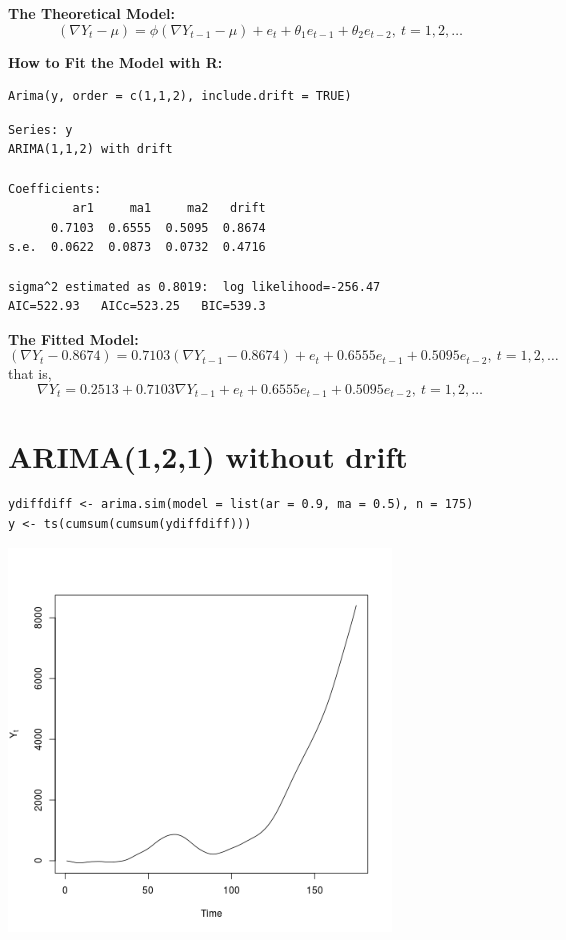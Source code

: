 \documentclass[12pt]{article}
\begin{document}
\noindent
\textbf{The Theoretical Model:} 
\[
(\nabla Y_{t} - \mu) = \phi(\nabla Y_{t - 1} - \mu) +  e_{t} + \theta_{1} e_{t - 1} + \theta_{2} e_{t - 2},\ t = 1,2,\ldots
\]

\noindent
\textbf{How to Fit the Model with R:}


\begin{verbatim}
Arima(y, order = c(1,1,2), include.drift = TRUE)
\end{verbatim}




\begin{verbatim}
Series: y 
ARIMA(1,1,2) with drift         

Coefficients:
         ar1     ma1     ma2   drift
      0.7103  0.6555  0.5095  0.8674
s.e.  0.0622  0.0873  0.0732  0.4716

sigma^2 estimated as 0.8019:  log likelihood=-256.47
AIC=522.93   AICc=523.25   BIC=539.3
\end{verbatim}

\noindent
\textbf{The Fitted Model:} 
\[
(\nabla Y_{t} - 0.8674 ) = 0.7103 (\nabla Y_{t - 1} - 0.8674 ) + e_{t} + 0.6555 e_{t - 1} + 0.5095 e_{t - 2},\ t = 1,2,\ldots
\]
that is,
\[
\nabla Y_{t} = 0.2513 + 0.7103 \nabla Y_{t - 1} + e_{t} + 0.6555 e_{t - 1} + 0.5095 e_{t - 2},\ t = 1,2,\ldots
\]
\section*{ARIMA(1,2,1) without drift}
\label{sec-9}


\begin{verbatim}
ydiffdiff <- arima.sim(model = list(ar = 0.9, ma = 0.5), n = 175)
y <- ts(cumsum(cumsum(ydiffdiff)))
\end{verbatim}





\includegraphics[width=4.0in]{img/arima121zm.png}
\end{document}
